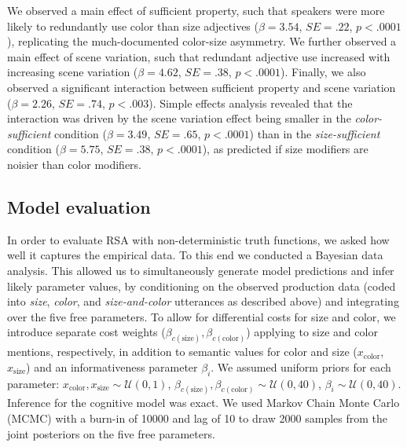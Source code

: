\documentclass[11pt]{article}
\newcommand{\jd}[1]{\textcolor{Red}{[jd: #1]}}
\begin{document}
We observed a main effect of sufficient property, such that speakers were more likely to redundantly use color than size adjectives ($\beta = 3.54$, $SE = .22$, $p < .0001$), replicating the much-documented color-size asymmetry. We further observed a main effect of scene variation, such that redundant adjective use increased with increasing scene variation ($\beta = 4.62$, $SE = .38$, $p < .0001$). Finally, we also observed a significant interaction between sufficient property and scene variation ($\beta = 2.26$, $SE = .74$, $p < .003$). Simple effects analysis revealed that the interaction was driven by the scene variation effect being smaller in the \emph{color-sufficient} condition ($\beta = 3.49$, $SE = .65$, $p < .0001$) than in the \emph{size-sufficient} condition ($\beta = 5.75$, $SE = .38$, $p < .0001$), as predicted if size modifiers are noisier than color modifiers.


\subsection{Model evaluation}
\label{sec:modifiermodeleval}


In order to evaluate RSA with non-deterministic truth functions, we asked how well it captures the empirical data. To this end we conducted a Bayesian data analysis.  This allowed us to  simultaneously generate model predictions and infer likely parameter values, by conditioning on the observed production data (coded into \emph{size}, \emph{color}, and \emph{size-and-color} utterances as described above) and integrating over the five free parameters. To allow for differential costs for size and color, we introduce separate cost weights ($\beta_{c(\textrm{size})}, \beta_{c(\textrm{color})}$) applying to size and color mentions, respectively, in addition to semantic values for color and size ($x_{\textrm{color}}$, $x_{\textrm{size}}$) and an informativeness parameter $\beta_i$. We assumed uniform priors for each parameter: $x_{\textrm{color}}, x_{\textrm{size}} \sim \mathcal{U}(0,1)$,  $\beta_{c(\textrm{size})}, \beta_{c(\textrm{color})} \sim \mathcal{U}(0,40)$, $\beta_i  \sim \mathcal{U}(0,40)$.
Inference for the cognitive model was exact. We used Markov Chain Monte Carlo (MCMC) with a burn-in of 10000 and lag of 10 to draw 2000 samples from the joint posteriors on the five free parameters.

\end{document}
